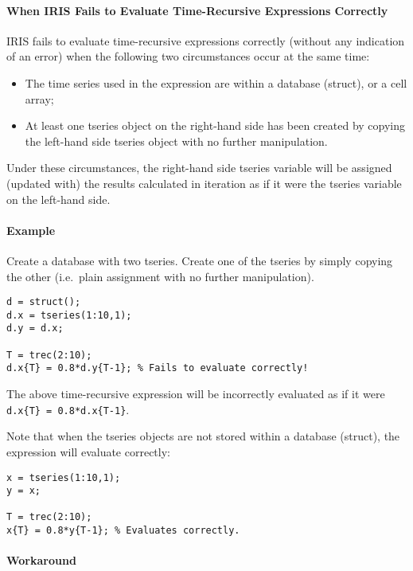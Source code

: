 \paragraph{When IRIS Fails to Evaluate Time-Recursive Expressions
Correctly}\label{when-iris-fails-to-evaluate-time-recursive-expressions-correctly}

IRIS fails to evaluate time-recursive expressions correctly (without any
indication of an error) when the following two circumstances occur at
the same time:

\begin{itemize}
\item
  The time series used in the expression are within a database (struct),
  or a cell array;
\item
  At least one tseries object on the right-hand side has been created by
  copying the left-hand side tseries object with no further
  manipulation.
\end{itemize}

Under these circumstances, the right-hand side tseries variable will be
assigned (updated with) the results calculated in iteration as if it
were the tseries variable on the left-hand side.

\paragraph{Example}\label{example-4}

Create a database with two tseries. Create one of the tseries by simply
copying the other (i.e.~plain assignment with no further manipulation).

\begin{verbatim}
d = struct();
d.x = tseries(1:10,1);
d.y = d.x;

T = trec(2:10);
d.x{T} = 0.8*d.y{T-1}; % Fails to evaluate correctly!
\end{verbatim}

The above time-recursive expression will be incorrectly evaluated as if
it were \texttt{d.x\{T\} = 0.8*d.x\{T-1\}}.

Note that when the tseries objects are not stored within a database
(struct), the expression will evaluate correctly:

\begin{verbatim}
x = tseries(1:10,1);
y = x;

T = trec(2:10);
x{T} = 0.8*y{T-1}; % Evaluates correctly.
\end{verbatim}

\paragraph{Workaround}\label{workaround}

